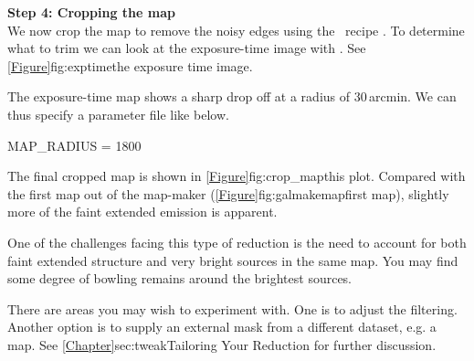 \textbf{Step 4: Cropping the map}
\vspace{0.2cm}\\
We now crop the map to remove the noisy edges using the \picard\ recipe
. To determine what to trim we can look
at the exposure-time image with \gaia.  See
\cref{Figure}{fig:exptime}{the exposure time image}.


The exposure-time map shows a sharp drop off at a radius of 30\,arcmin.
We can thus specify a parameter file like below.
\begin{center}
\begin{terminalv}
MAP_RADIUS = 1800
\end{terminalv}
\end{center}

\begin{terminalv}
\end{terminalv}
The final cropped map is shown in \cref{Figure}{fig:crop_map}{this plot}.
Compared with the first map out of the map-maker
(\cref{Figure}{fig:galmakemap}{first map}),
slightly more of the faint extended emission is apparent.

One of the challenges facing this type of reduction is the need to
account for both faint extended structure and very bright sources in
the same map. You may find some degree of bowling remains around the
brightest sources.

There are areas you may wish to experiment with. One is to adjust the
filtering. Another option is to supply an external mask from
a different dataset, e.g. a
 map.
See \cref{Chapter}{sec:tweak}{Tailoring Your Reduction} for further
discussion.



\clearpage
